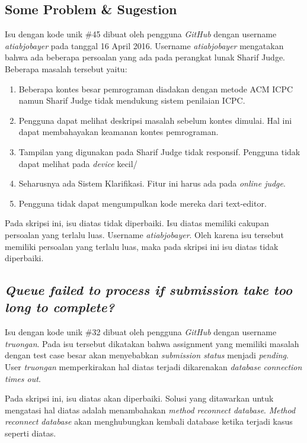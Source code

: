\subsection{Some Problem \& Sugestion}
Isu dengan kode unik \#45 dibuat oleh pengguna \textit{GitHub} dengan username \textit{atiabjobayer} pada tanggal 16 April 2016. Username \textit{atiabjobayer} mengatakan bahwa ada beberapa persoalan yang ada pada perangkat lunak Sharif Judge. Beberapa masalah tersebut yaitu:
	\begin{enumerate}
		\item Beberapa kontes besar pemrograman diadakan dengan metode ACM ICPC namun Sharif Judge tidak mendukung sistem penilaian ICPC.
		\item Pengguna dapat melihat deskripsi masalah sebelum kontes dimulai. Hal ini dapat membahayakan keamanan kontes pemrograman.
		\item Tampilan yang digunakan pada Sharif Judge tidak responsif. Pengguna tidak dapat melihat pada \textit{device} kecil/
		\item Seharusnya ada Sistem Klarifikasi. Fitur ini harus ada pada \textit{online judge}.
		\item Pengguna tidak dapat mengumpulkan kode mereka dari text-editor.
	\end{enumerate}

Pada skripsi ini, isu diatas tidak diperbaiki. Isu diatas memiliki cakupan persoalan yang terlalu luas. Username \textit{atiabjobayer}. Oleh karena isu tersebut memiliki persoalan yang terlalu luas, maka pada skripsi ini isu diatas tidak diperbaiki.
	
\subsection{\textit{Queue failed to process if submission take too long to complete?}}
Isu dengan kode unik \#32 dibuat oleh pengguna \textit{GitHub} dengan username \textit{truongan}. Pada isu tersebut dikatakan bahwa assignment yang memiliki masalah dengan test case besar akan menyebabkan \textit{submission status} menjadi \textit{pending}. User \textit{truongan} memperkirakan hal diatas terjadi dikarenakan \textit{database connection times out}. 

Pada skripsi ini, isu diatas akan diperbaiki. Solusi yang ditawarkan untuk mengatasi hal diatas adalah menambahakan \textit{method reconnect database}. \textit{Method reconnect database} akan menghubungkan kembali database ketika terjadi kasus seperti diatas.

